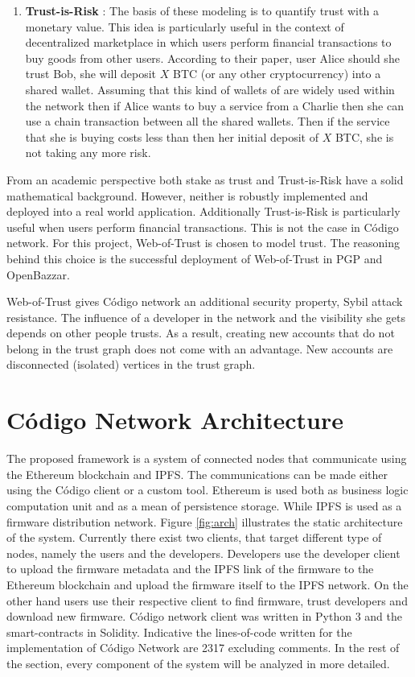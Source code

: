 {{\begin{enumerate}
\item \textbf{Trust-is-Risk} \cite{cryptoeprint:2017:156}: The basis of these modeling is to quantify trust with a monetary value. This idea is particularly useful in the context of decentralized marketplace in which users perform financial transactions to buy goods from other users. According to their paper, user Alice should she trust Bob, she will deposit $X$ BTC (or any other cryptocurrency) into a shared wallet. Assuming that this kind of wallets of are widely used within the network then if Alice wants to buy a service from a Charlie then she can use a chain transaction between all the shared wallets. Then if the service that she is buying costs less than then her initial deposit of $X$ BTC, she is not taking any more risk.
\end{enumerate}

From an academic perspective both stake as trust and Trust-is-Risk have a solid mathematical background. However, neither is robustly implemented and deployed into a real world application. Additionally Trust-is-Risk is particularly useful when users perform financial transactions. This is not the case in Código network. For this project, Web-of-Trust is chosen to model trust. The reasoning behind this choice is the successful deployment of Web-of-Trust in PGP and OpenBazzar.

Web-of-Trust gives Código network an additional security property, Sybil attack resistance. The influence of a developer in the network and the visibility she gets depends on other people trusts. As a result, creating new accounts that do not belong in the trust graph does not come with an advantage. New accounts are disconnected (isolated) vertices in the trust graph.

}
\section{Código Network Architecture}{
The proposed framework is a system of connected nodes that communicate using the Ethereum blockchain and IPFS. The communications can be made either using the Código client or a custom tool. Ethereum is used both as business logic computation unit and as a mean of persistence storage. While IPFS is used as a firmware distribution network. Figure \ref{fig:arch} illustrates the static architecture of the system. Currently there exist two clients, that target different type of nodes, namely the users and the developers. Developers use the developer client to upload the firmware metadata and the IPFS link of the firmware to the Ethereum blockchain and upload the firmware itself to the IPFS network. On the other hand users use their respective client to find firmware, trust developers and download new firmware. Código network client was written in Python 3 and the smart-contracts in Solidity. Indicative the lines-of-code written for the implementation of Código Network are 2317 excluding comments. In the rest of the section, every component of the system will be analyzed in more detailed. 

}}
